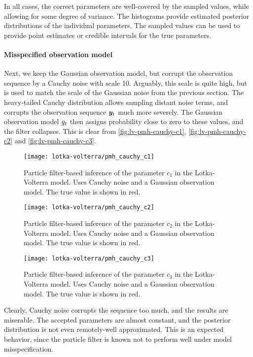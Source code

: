 In all cases, the correct parameters are well-covered by the sampled values, while allowing for some degree of variance. The histograms provide estimated posterior distributions of the individual parameters. The sampled values can be used to provide point estimates or credible intervals for the true parameters.

\paragraph{Misspecified observation model}
Next, we keep the Gaussian observation model, but corrupt the observation sequence by a Cauchy noise with scale 10. Arguably, this scale is quite high, but is used to match the scale of the Gaussian noise from the previous section. The heavy-tailed Cauchy distribution allows sampling distant noise terms, and corrupts the observation sequence $\bm{y}_t$ much more severely. The Gaussian observation model $g_t$ then assigns probability close to zero to these values, and the filter collapses. This is clear from \autoref{fig:lv-pmh-cauchy-c1}, \autoref{fig:lv-pmh-cauchy-c2} and \autoref{fig:lv-pmh-cauchy-c3}.

\begin{figure}[ht]
    \centering
    \texttt{[image: lotka-volterra/pmh\_cauchy\_c1]}
    \caption{Particle filter-based inference of the parameter $c_1$ in the Lotka-Volterra model. Uses Cauchy noise and a Gaussian observation model. The true value is shown in red.}
    \label{fig:lv-pmh-cauchy-c1}
\end{figure}

\begin{figure}[ht]
    \centering
    \texttt{[image: lotka-volterra/pmh\_cauchy\_c2]}
    \caption{Particle filter-based inference of the parameter $c_2$ in the Lotka-Volterra model. Uses Cauchy noise and a Gaussian observation model. The true value is shown in red.}
    \label{fig:lv-pmh-cauchy-c2}
\end{figure}

\begin{figure}[ht]
    \centering
    \texttt{[image: lotka-volterra/pmh\_cauchy\_c3]}
    \caption{Particle filter-based inference of the parameter $c_3$ in the Lotka-Volterra model. Uses Cauchy noise and a Gaussian observation model. The true value is shown in red.}
    \label{fig:lv-pmh-cauchy-c3}
\end{figure}

Clearly, Cauchy noise corrupts the sequence too much, and the results are miserable. The accepted parameters are almost constant, and the posterior distribution is not even remotely-well approximated. This is an expected behavior, since the particle filter is known not to perform well under model misspecification.



